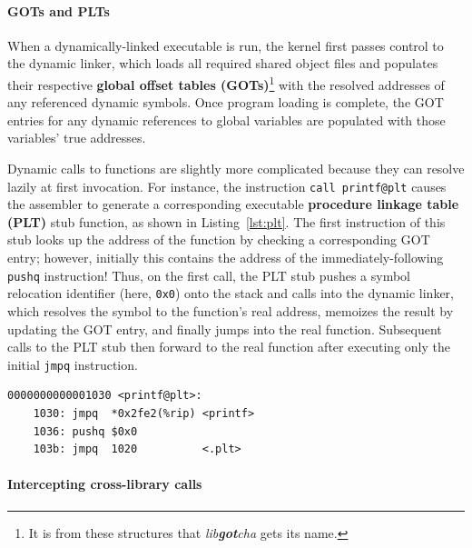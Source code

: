 \paragraph{GOTs and PLTs}

When a dynamically-linked executable is run, the kernel first passes control to the
dynamic linker, which loads all required shared object files and populates their
respective \textbf{global offset tables (GOTs)}\footnote{It is from these structures
that \textit{lib\textbf{got}cha} gets its name.} with the resolved addresses of any
referenced dynamic symbols.  Once program loading is complete, the GOT entries
for any dynamic references to global variables are populated with those variables'
true addresses.

Dynamic calls to functions are slightly more complicated because they can resolve
lazily at first invocation.  For instance, the instruction
\texttt{call~printf@plt} causes the assembler to generate a corresponding executable
\textbf{procedure linkage table (PLT)} stub function, as shown in
Listing~\ref{lst:plt}.  The first instruction of this stub looks up the address of
the
function by checking a corresponding GOT entry; however, initially this contains the
address of the immediately-following \texttt{pushq} instruction!  Thus, on the first
call, the PLT stub pushes a symbol relocation identifier (here, \texttt{0x0}) onto
the stack and calls into the dynamic linker, which resolves the symbol to the
function's real address, memoizes the result by updating the GOT entry, and finally
jumps into the real function.  Subsequent calls to the PLT stub then forward to the
real function after executing only the initial \texttt{jmpq} instruction.

\begin{lstlisting}[label=lst:plt,caption=Example PLT entry for call to \texttt{printf()}]
0000000000001030 <printf@plt>:
	1030: jmpq  *0x2fe2(%rip) <printf>
	1036: pushq $0x0
	103b: jmpq  1020          <.plt>
\end{lstlisting}

\paragraph{Intercepting cross-library calls}


